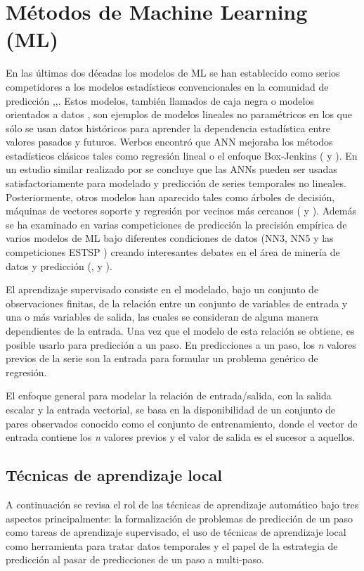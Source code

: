 \documentclass{llncs}
\begin{document}
\section{Métodos de Machine Learning (ML)}
En las últimas dos décadas los modelos de ML se han establecido como serios competidores a los modelos estadísticos convencionales en la comunidad de predicción \cite{Ahmed2010594},\cite{Palit2005},\cite{Zhang199835}. Estos modelos, también llamados de caja negra o modelos orientados a datos \cite{Mitchell1997}, son ejemplos de modelos lineales no paramétricos en los que sólo se usan datos históricos para aprender la dependencia estadística entre valores pasados y futuros. Werbos encontró que ANN mejoraba los métodos estadísticos clásicos tales como regresión lineal o el enfoque Box-Jenkins (\cite{Werbos1974} y \cite{Werbos1988339}). En un estudio similar realizado por \cite{Lapedes1987} se concluye que las ANNs pueden ser usadas satisfactoriamente para modelado y predicción de series temporales no lineales. Posteriormente, otros modelos han aparecido tales como árboles de decisión, máquinas de vectores soporte y regresión por vecinos más cercanos (\cite{Hastie2001} y \cite{Alpaydin2004}). Además se ha examinado en varias competiciones de predicción la precisión empírica de varios modelos de ML bajo diferentes condiciones de datos (NN3, NN5 y las competiciones ESTSP \cite{Crone2009456}\cite{Crone}\cite{Lendasse2007}) creando interesantes debates en el área de minería de datos y predicción (\cite{Hand2008}, \cite{Price2009452} y \cite{Crone2009456}).


El aprendizaje supervisado consiste en el modelado, bajo un conjunto de observaciones finitas, de la relación entre un conjunto de variables de entrada y una o más variables de salida, las cuales se consideran de alguna manera dependientes de la entrada. Una vez que el modelo de esta relación se obtiene, es posible usarlo para predicción a un paso. En predicciones a un paso, los \emph{n} valores previos de la serie son la entrada para formular un problema genérico de regresión. 

El enfoque general para modelar la relación de entrada/salida, con la salida escalar y la entrada vectorial, se basa en la disponibilidad de un conjunto de pares observados conocido como el conjunto de entrenamiento, donde el vector de entrada contiene los \emph{n} valores previos y el valor de salida es el sucesor a aquellos.

\subsection{Técnicas de aprendizaje local\\}
A continuación se revisa el rol de las técnicas de aprendizaje automático bajo tres aspectos principalmente: la formalización de problemas de predicción de un paso como tareas de aprendizaje supervisado, el uso de técnicas de aprendizaje local como herramienta para tratar datos temporales y el papel de la estrategia de predicción al pasar de predicciones de un paso a multi-paso. 
\end{document}
